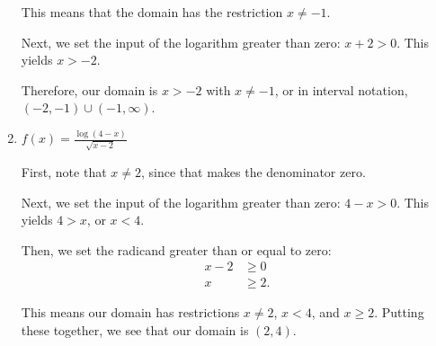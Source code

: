 \documentclass{ximera}
\begin{document}
\begin{enumerate}
\begin{explanation}
\begin{expandable}
This means that the domain has the restriction $x \ne -1$. 

Next, we set the input of the logarithm greater than zero: $x + 2 > 0$. This yields $x > -2$.

Therefore, our domain is $x > -2$ with $x \ne -1$, or in interval notation, $(-2, -1) \cup (-1, \infty)$. 
			\end{expandable}
		\end{explanation}
	\item $f(x) = \frac{\log(4 - x)}{\sqrt{x - 2}}$
		\begin{explanation}
			\begin{expandable}
First, note that $x \ne 2$, since that makes the denominator zero.

Next, we set the input of the logarithm greater than zero: $4 - x > 0$. This yields $4 > x$, or $x < 4$.

Then, we set the radicand greater than or equal to zero: \begin{align*}x - 2&\ge 0 \\ x & \ge 2. \end{align*}

This means our domain has restrictions $x \ne 2$, $x < 4$, and $x \ge 2$. Putting these together, we see that our domain is $(2, 4)$. 
			\end{expandable}
		\end{explanation}
\end{enumerate}



\end{document}
